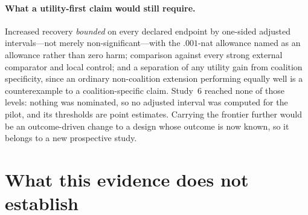 \documentclass[10pt]{article}
\begin{document}
\paragraph{What a utility-first claim would still require.} Increased recovery \emph{bounded} on every
declared endpoint by one-sided adjusted intervals---not merely non-significant---with the $.001$-nat allowance
named as an allowance rather than zero harm; comparison against every strong external comparator and local
control; and a separation of any utility gain from coalition specificity, since an ordinary non-coalition
extension performing equally well is a counterexample to a coalition-specific claim. Study~6 reached none of
those levels: nothing was nominated, so no adjusted interval was computed for the pilot, and its thresholds are
point estimates. Carrying the frontier further would be an outcome-driven change to a design whose outcome is
now known, so it belongs to a new prospective study.

\section{What this evidence does not establish}
\label{sec:limits}
\end{document}

